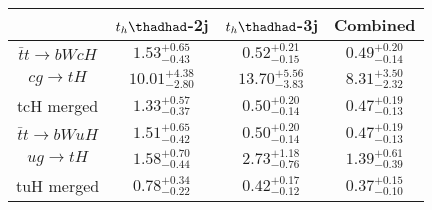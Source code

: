 \centering
\begin{tabular}{|c|c|c|c|} \hline
 & $t_h\thadhad$-2j & $t_h\thadhad$-3j & Combined\\\hline
$\bar{t}t\to bWcH$ & $1.53^{+0.65}_{-0.43}$ & $0.52^{+0.21}_{-0.15}$ & $0.49^{+0.20}_{-0.14}$\\\hline
$cg\to tH$ & $10.01^{+4.38}_{-2.80}$ & $13.70^{+5.56}_{-3.83}$ & $8.31^{+3.50}_{-2.32}$\\\hline
tcH merged & $1.33^{+0.57}_{-0.37}$ & $0.50^{+0.20}_{-0.14}$ & $0.47^{+0.19}_{-0.13}$\\\hline
$\bar{t}t\to bWuH$ & $1.51^{+0.65}_{-0.42}$ & $0.50^{+0.20}_{-0.14}$ & $0.47^{+0.19}_{-0.13}$\\\hline
$ug\to tH$ & $1.58^{+0.70}_{-0.44}$ & $2.73^{+1.18}_{-0.76}$ & $1.39^{+0.61}_{-0.39}$\\\hline
tuH merged & $0.78^{+0.34}_{-0.22}$ & $0.42^{+0.17}_{-0.12}$ & $0.37^{+0.15}_{-0.10}$\\\hline
\end{tabular}
